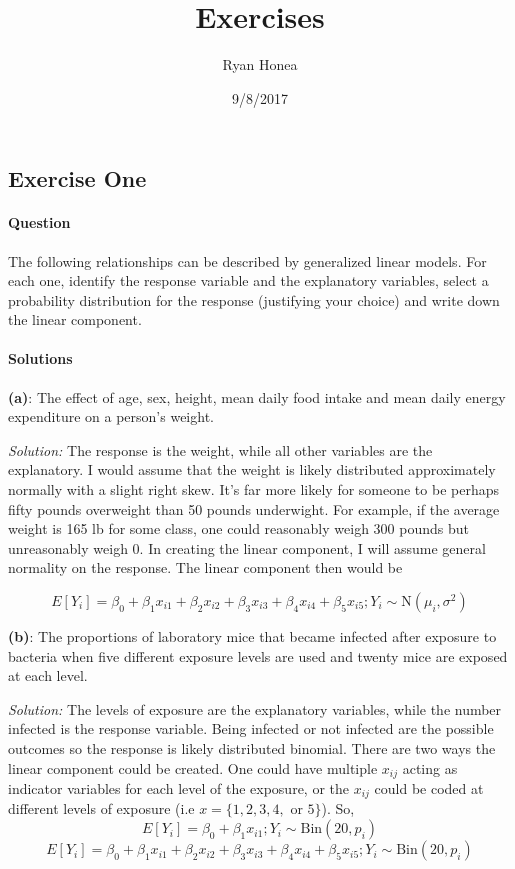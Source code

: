 \documentclass[]{article}
\title{Exercises}
\author{Ryan Honea}
\date{9/8/2017}
\let\oldparagraph\paragraph
\renewcommand{\paragraph}[1]{\oldparagraph{#1}\mbox{}}
\begin{document}
\maketitle

\subsection{Exercise One}\label{exercise-one}

\paragraph{Question}\label{question}

The following relationships can be described by generalized linear
models. For each one, identify the response variable and the explanatory
variables, select a probability distribution for the response
(justifying your choice) and write down the linear component.

\paragraph{Solutions}\label{solutions}

\textbf{(a)}: The effect of age, sex, height, mean daily food intake and
mean daily energy expenditure on a person's weight.

\emph{Solution: } The response is the weight, while all other variables
are the explanatory. I would assume that the weight is likely
distributed approximately normally with a slight right skew. It's far
more likely for someone to be perhaps fifty pounds overweight than 50
pounds underwight. For example, if the average weight is 165 lb for some
class, one could reasonably weigh 300 pounds but unreasonably weigh 0.
In creating the linear component, I will assume general normality on the
response. The linear component then would be

\[E[Y_i] = \beta_0 + \beta_1x_{i1} + \beta_2x_{i2} + \beta_3x_{i3} + \beta_4x_{i4} + \beta_5x_{i5}; Y_i \sim \text{N}(\mu_i, \sigma^2)\]

\textbf{(b)}: The proportions of laboratory mice that became infected
after exposure to bacteria when five different exposure levels are used
and twenty mice are exposed at each level.

\emph{Solution: } The levels of exposure are the explanatory variables,
while the number infected is the response variable. Being infected or
not infected are the possible outcomes so the response is likely
distributed binomial. There are two ways the linear component could be
created. One could have multiple \(x_{ij}\) acting as indicator
variables for each level of the exposure, or the \(x_{ij}\) could be
coded at different levels of exposure (i.e
\(x = \{1,2,3,4, \text{ or } 5\}\)). So,
\[E[Y_i] = \beta_0 + \beta_1x_{i1}; Y_i \sim \text{Bin}(20, p_i)\]
\[E[Y_i] = \beta_0 + \beta_1x_{i1} + \beta_2x_{i2} + \beta_3x_{i3} + \beta_4x_{i4} + \beta_5x_{i5}; Y_i \sim \text{Bin}(20, p_i)\]
\end{document}
